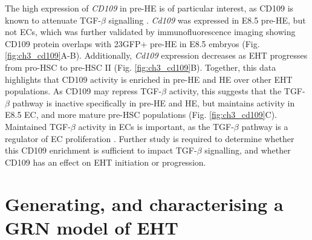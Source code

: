 The high expression of \textit{CD109} in pre-HE is of particular interest, as CD109 is known to attenuate TGF-$\beta$ signalling \citep{mii_cd109_2019}. \textit{Cd109} was expressed in E8.5 pre-HE, but not ECs, which was further validated by immunofluorescence imaging showing CD109 protein overlaps with 23GFP+ pre-HE in E8.5 embryos (Fig. \ref{fig:ch3_cd109}A-B). Additionally, \textit{Cd109} expression decreases as EHT progresses from pro-HSC to pre-HSC II (Fig. \ref{fig:ch3_cd109}B). Together, this data highlights that CD109 activity is enriched in pre-HE and HE over other EHT populations. As CD109 may repress TGF-$\beta$ activity, this suggests that the TGF-$\beta$ pathway is inactive specifically in pre-HE and HE, but maintains activity in E8.5 EC, and more mature pre-HSC populations (Fig. \ref{fig:ch3_cd109}C). Maintained TGF-$\beta$ activity in ECs is important, as the TGF-$\beta$ pathway is a regulator of EC proliferation \citep{lebrin_tgf-_2005, goumans_balancing_2002}. Further study is required to determine whether this CD109 enrichment is sufficient to impact TGF-$\beta$ signalling, and whether CD109 has an effect on EHT initiation or progression. 

\section{\label{ch3:grn}Generating, and characterising a GRN model of EHT}

